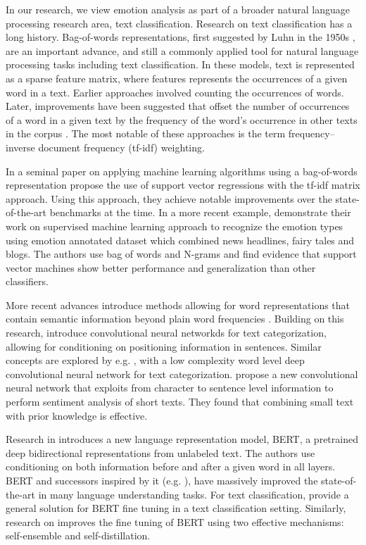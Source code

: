 \documentclass[conference]{IEEEtran}
\begin{document}
In our research, we view emotion analysis as part of a broader natural language processing research area, text classification. Research on text classification has a long history. Bag-of-words representations, first suggested by Luhn in the 1950s \cite{luhn}, are an important advance, and still a commonly applied tool for natural language processing tasks including text classification. In these models, text is represented as a sparse feature matrix, where features represents the occurrences of a given word in a text. Earlier approaches involved counting the occurrences of words. Later, improvements have been suggested that offset the number of occurrences of a word in a given text by the frequency of the word's occurrence in other texts in the corpus \cite{tfidf}. The most notable of these approaches is the term frequency–inverse document frequency (tf-idf) weighting.

In a seminal paper on applying machine learning algorithms using a bag-of-words representation \cite{joachims-svm} propose the use of support vector regressions with the tf-idf matrix approach. Using this approach, they achieve notable improvements over the state-of-the-art benchmarks at the time. In a more recent example, \cite{chaffaretal}  demonstrate their work on supervised machine learning approach to recognize the emotion types using emotion annotated dataset which combined news headlines, fairy tales and blogs. The authors use bag of words and N-grams and find evidence that support vector machines show better performance and generalization than other classifiers. 

More recent advances introduce methods allowing for word representations that contain semantic information beyond plain word frequencies \cite{mikolov2013distributed, mikolov2013efficient, bojanowski2016enriching, joulin2016bag}. Building on this research, \cite{kim-2014-convolutional} introduce convolutional neural networkds for text categorization, allowing for conditioning on positioning information in sentences. Similar concepts are explored by e.g. \cite{johnsonetal}, with a low complexity word level deep convolutional neural network for text categorization. \cite{dossantosetal} propose a new convolutional neural network that exploits from character to sentence level information to perform sentiment analysis of short texts. They found that combining small text with prior knowledge is effective.

Research in \cite{bert} introduces a new language representation model, BERT, a pretrained deep bidirectional representations from unlabeled text. The authors use conditioning on both information before and after a given word in all layers. BERT and successors inspired by it (e.g. \cite{xlnet}), have massively improved the state-of-the-art in many language understanding tasks. For text classification, \cite{ bertclassification} provide a general solution for BERT fine tuning in a text classification setting. Similarly, research on \cite{xu2020improving} improves the fine tuning of BERT using two effective mechanisms: self-ensemble and self-distillation.
\end{document}

